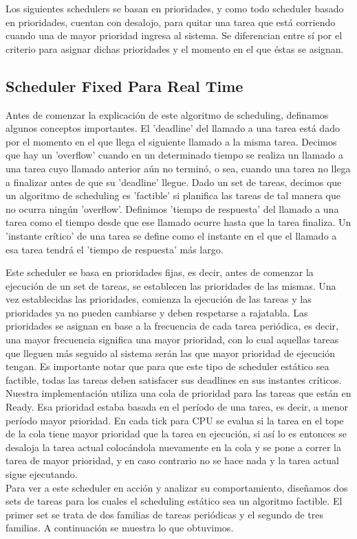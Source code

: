 Los siguientes schedulers se basan en prioridades, y como todo scheduler basado en prioridades, cuentan con desalojo, para quitar una tarea que está corriendo cuando una de mayor prioridad ingresa al sistema. Se diferencian entre sí por el criterio para asignar dichas prioridades y el momento en el que éstas se asignan.

\subsection{Scheduler Fixed Para Real Time}
Antes de comenzar la explicación de este algoritmo de scheduling, definamos algunos conceptos importantes. El 'deadline' del llamado a una tarea está dado por el momento en el que llega el siguiente llamado a la misma tarea. Decimos que hay un 'overflow' cuando en un determinado tiempo se realiza un llamado a una tarea cuyo llamado anterior aún no terminó, o sea, cuando una tarea no llega a finalizar antes de que su 'deadline' llegue. Dado un set de tareas, decimos que un algoritmo de scheduling es 'factible' si planifica las tareas de tal manera que no ocurra ningún 'overflow'. Definimos 'tiempo de respuesta' del llamado a una tarea como el tiempo desde que ese llamado ocurre hasta que la tarea finaliza. Un 'instante crítico' de una tarea se define como el instante en el que el llamado a esa tarea tendrá el 'tiempo de respuesta' más largo.

Este scheduler se basa en prioridades fijas, es decir, antes de comenzar la ejecución de un set de tareas, se establecen las prioridades de las mismas. Una vez establecidas las prioridades, comienza la ejecución de las tareas y las prioridades ya no pueden cambiarse y deben respetarse a rajatabla. Las prioridades se asignan en base a la frecuencia de cada tarea periódica, es decir, una mayor frecuencia significa una mayor prioridad, con lo cual aquellas tareas que lleguen más seguido al sistema serán las que mayor prioridad de ejecución tengan. Es importante notar que para que este tipo de scheduler estático sea factible, todas las tareas deben satisfacer sus deadlines en sus instantes críticos.
\\
Nuestra implementación utiliza una cola de prioridad para las tareas que están en Ready. Esa prioridad estaba basada en el período de una tarea, es decir, a menor período mayor prioridad. En cada tick para CPU se evalua si la tarea en el tope de la cola tiene mayor prioridad que la tarea en ejecución, si así lo es entonces se desaloja la tarea actual colocándola nuevamente en la cola y se pone a correr la tarea de mayor prioridad, y en caso contrario no se hace nada y la tarea actual sigue ejecutando.
\\
Para ver a este scheduler en acción y analizar su comportamiento, diseñamos dos sets de tareas para los cuales el scheduling estático sea un algoritmo factible. El primer set se trata de dos familias de tareas periódicas y el segundo de tres familias. A continuación se muestra lo que obtuvimos.

